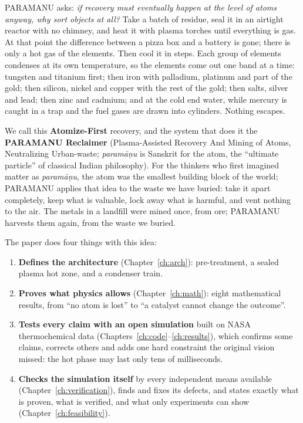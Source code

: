 \documentclass[11pt,a4paper]{article}
\begin{document}
PARAMANU asks: \emph{if recovery must eventually happen at the level of atoms anyway, why sort objects at all?} Take a batch of residue, seal it in an airtight reactor with no chimney, and heat it with plasma torches until everything is gas. At that point the difference between a pizza box and a battery is gone; there is only a hot gas of the elements. Then cool it in steps. Each group of elements condenses at its own temperature, so the elements come out one band at a time: tungsten and titanium first; then iron with palladium, platinum and part of the gold; then silicon, nickel and copper with the rest of the gold; then salts, silver and lead; then zinc and cadmium; and at the cold end water, while mercury is caught in a trap and the fuel gases are drawn into cylinders. Nothing escapes.

We call this \textbf{Atomize-First} recovery, and the system that does it the \textbf{PARAMANU Reclaimer} (Plasma-Assisted Recovery And Mining of Atoms, Neutralizing Urban-waste; \emph{param\={a}\d{n}u} is Sanskrit for the atom, the ``ultimate particle'' of classical Indian philosophy). For the thinkers who first imagined matter as \emph{param\={a}\d{n}u}, the atom was the smallest building block of the world; PARAMANU applies that idea to the waste we have buried: take it apart completely, keep what is valuable, lock away what is harmful, and vent nothing to the air. The metals in a landfill were mined once, from ore; PARAMANU harvests them again, from the waste we buried.

The paper does four things with this idea:
\begin{enumerate}
\item \textbf{Defines the architecture} (Chapter~\ref{ch:arch}): pre-treatment, a sealed plasma hot zone, and a condenser train.
\item \textbf{Proves what physics allows} (Chapter~\ref{ch:math}): eight mathematical results, from ``no atom is lost'' to ``a catalyst cannot change the outcome''.
\item \textbf{Tests every claim with an open simulation} built on NASA thermochemical data (Chapters~\ref{ch:code}--\ref{ch:results}), which confirms some claims, corrects others and adds one hard constraint the original vision missed: the hot phase may last only tens of milliseconds.
\item \textbf{Checks the simulation itself} by every independent means available (Chapter~\ref{ch:verification}), finds and fixes its defects, and states exactly what is proven, what is verified, and what only experiments can show (Chapter~\ref{ch:feasibility}).
\end{enumerate}
\end{document}
